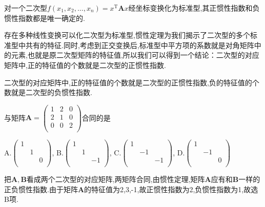 \begin{ttheorem}[（惯性定理）]
    对一个二次型$f(x_1,x_2,\dots,x_n)=x^\mathrm{T}\mathbf{A}x$经坐标变换化为标准型,其正惯性指数和负惯性指数都是唯一确定的.
\end{ttheorem}

存在多种线性变换可以化二次型为标准型,惯性定理为我们揭示了二次型的多个标准型中共有的特征.同时,考虑到正交变换后,标准型中平方项的系数就是对角矩阵中的元素,也就是原二次型矩阵的特征值,所以我们可以得到一个结论：二次型的对应矩阵中,正的特征值的个数就是二次型的正惯性指数.

\begin{ttheorem}
    二次型的对应矩阵中,正的特征值的个数就是二次型的正惯性指数,负的特征值的个数就是二次型的负惯性指数.
\end{ttheorem}

\begin{examp}{与矩阵$\mathbf{A}=
    \begin{pmatrix}
1   &   2   &   0   \\
2   &   1   &   0   \\
0   &   0   &   2   \\
\end{pmatrix}$合同的是

A.$\begin{pmatrix}
1   &      &      \\
   &   1   &      \\
   &      &   0   \\
\end{pmatrix}$,
B.$\begin{pmatrix}
1   &      &      \\
   &   1   &      \\
   &      &   -1   \\
\end{pmatrix}$,
C.$\begin{pmatrix}
1   &      &      \\
   &   -1   &      \\
   &      &   -1   \\
\end{pmatrix}$,
D.$\begin{pmatrix}
1   &      &      \\
   &   -1   &      \\
   &      &   0   \\
\end{pmatrix}$}

\jie 把$\mathbf{A},\mathbf{B}$看成两个二次型的对应矩阵,两矩阵合同,由惯性定理,矩阵$\mathbf{A}$应有和$\mathbf{B}$一样的正负惯性指数.由于矩阵$\mathbf{A}$的特征值为2,3,-1,故正惯性指数为2,负惯性指数为1,故选B项.
\end{examp}

